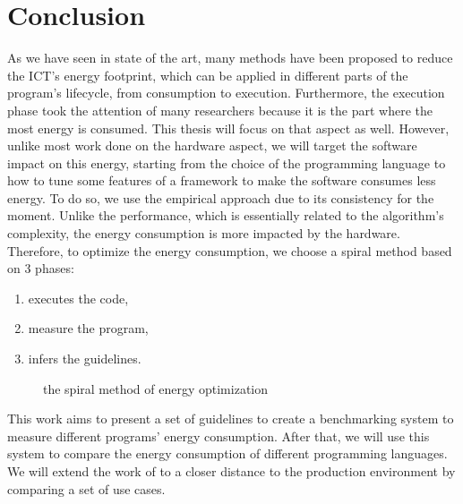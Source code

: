 \section{Conclusion}
As we have seen in state of the art, many methods have been proposed to reduce the ICT's energy footprint, which can be applied in different parts of the program's lifecycle, from consumption to execution.
Furthermore, the execution phase took the attention of many researchers because it is the part where the most energy is consumed.
This thesis will focus on that aspect as well.
However, unlike most work done on the hardware aspect, we will target the software impact on this energy, starting from the choice of the programming language to how to tune some features of a framework to make the software consumes less energy.
To do so, we use the empirical approach due to its consistency for the moment.
Unlike the performance, which is essentially related to the algorithm's complexity, the energy consumption is more impacted by the hardware.
Therefore, to optimize the energy consumption, we choose a spiral method based on 3 phases:
\begin{enumerate}
    \item executes the code,
    \item measure the program,
    \item infers the guidelines.
\end{enumerate}

\begin{figure}[!hbt]
    \caption{the spiral method of energy optimization }\label{fig:spirals}
\end{figure}


This work aims to present a set of guidelines to create a benchmarking system to measure different programs' energy consumption.
After that, we will use this system to compare the energy consumption of different programming languages. We will extend the work of \citeauthor{pereira_energy_2017} to a closer distance to the production environment by comparing a set of use cases.

